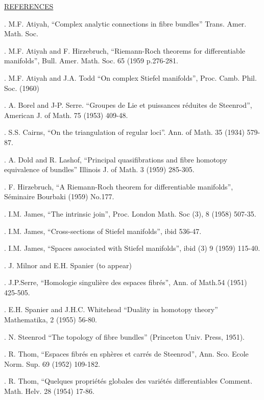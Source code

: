 \uline{REFERENCES}

. M.F. Atiyah, ``Complex analytic connections in fibre bundles''
Trans. Amer. Math. Soc.

. M.F. Atiyah and F. Hirzebruch, ``Riemann-Roch theorems for
differentiable manifolds'', Bull. Amer. Math. Soc. 65 (1959\unsure{)}
p.276-281.

. M.F. Atiyah and J.A. Todd ``On complex Stiefel manifolds'',
Proc. Camb. Phil. Soc. (1960)

. A. Borel and J-P. Serre. ``Groupes de Lie et puissances
réduites de Steenrod'', American J. of Math. 75 (1953) 409-48.

. S.S. Cairns, ``On the triangulation of regular loci''.
Ann. of Math. 35 (1934) 579-87.

. A. Dold and R. Lashof, ``Principal quasifibrations and fibre
homotopy equivalence of bundles'' Illinois J. of Math. 3 (1959) 285-305.

. F. Hirzebruch, ``A Riemann-Roch theorem for differentiable
manifolds'', Séminaire Bourbaki (1959) No.177.

. I.M. James, ``The intrinsic join'', Proc. London Math. Soc
(3), 8 (1958) 507-35.

. I.M. James, ``Cross-sections of Stiefel manifolds'', ibid
536-47.

. I.M. James, ``Spaces associated with Stiefel manifolds'',
ibid (3) 9 (1959) 115-40.

. J. Milnor and E.H. Spanier (to appear)

. J.P.Serre, ``Homologie singulière des espaces fibrés'',
Ann. of Math.54 (1951) 425-505.

. E.H. Spanier and J.H.C. Whitehead ``Duality in homotopy
theory'' Mathematika, 2 (1955) 56-80.

. N. Steenrod ``The topology of fibre bundles''
(Princeton Univ. Press, 1951).

. R. Thom, ``Espaces fibrés en sphères et carrés de Steenrod'',
Ann. Sco. Ecole Norm. Sup. 69 (1952) 109-182.

. R. Thom, ``Quelques propriétés globales des variétés
differentiables Comment. Math. Helv. 28 (1954) 17-86.

